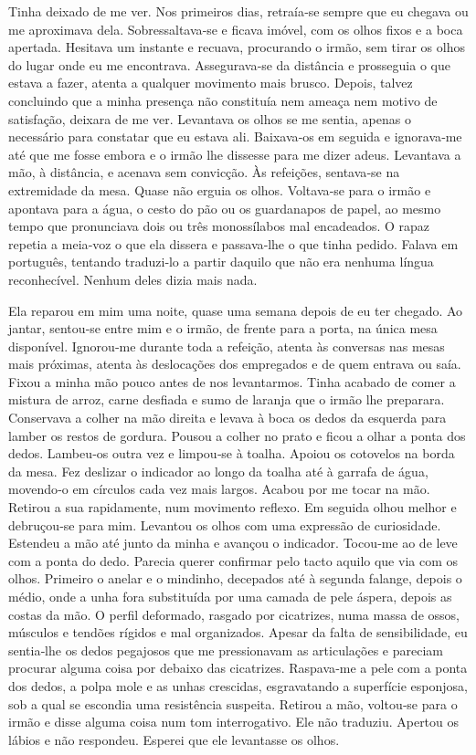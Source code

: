 Tinha deixado de me ver. Nos primeiros dias, retraía­‑se sempre que eu
chegava ou me aproximava dela. Sobressaltava­‑se e ficava imóvel, com os
olhos fixos e a boca apertada. Hesitava um instante e recuava,
procurando o irmão, sem tirar os olhos do lugar onde eu me encontrava.
Assegurava­‑se da distância e prosseguia o que estava a fazer, atenta a
qualquer movimento mais brusco. Depois, talvez concluindo que a minha
presença não constituía nem ameaça nem motivo de satisfação, deixara de
me ver. Levantava os olhos se me sentia, apenas o necessário para
constatar que eu estava ali. Baixava­‑os em seguida e ignorava­‑me até
que me fosse embora e o irmão lhe dissesse para me dizer adeus.
Levantava a mão, à distância, e acenava sem convicção. Às refeições,
sentava­‑se na extremidade da mesa. Quase não erguia os olhos.
Voltava­‑se para o irmão e apontava para a água, o cesto do pão ou os
guardanapos de papel, ao mesmo tempo que pronunciava dois ou três
monossílabos mal encadeados. O rapaz repetia a meia­‑voz o que ela
dissera e passava­‑lhe o que tinha pedido. Falava em português, tentando
traduzi­‑lo a partir daquilo que não era nenhuma língua reconhecível.
Nenhum deles dizia mais nada.

Ela reparou em mim uma noite, quase uma semana depois de eu ter chegado.
Ao jantar, sentou­‑se entre mim e o irmão, de frente para a porta, na
única mesa disponível. Ignorou­‑me durante toda a refeição, atenta às
conversas nas mesas mais próximas, atenta às deslocações dos empregados
e de quem entrava ou saía. Fixou a minha mão pouco antes de nos
levantarmos. Tinha acabado de comer a mistura de arroz, carne desfiada e
sumo de laranja que o irmão lhe preparara. Conservava a colher na mão
direita e levava à boca os dedos da esquerda para lamber os restos de
gordura. Pousou a colher no prato e ficou a olhar a ponta dos dedos.
Lambeu­‑os outra vez e limpou­‑se à toalha. Apoiou os cotovelos na borda
da mesa. Fez deslizar o indicador ao longo da toalha até à garrafa de
água, movendo­‑o em círculos cada vez mais largos. Acabou por me tocar
na mão. Retirou a sua rapidamente, num movimento reflexo. Em seguida
olhou melhor e debruçou­‑se para mim. Levantou os olhos com uma
expressão de curiosidade. Estendeu a mão até junto da minha e avançou o
indicador. Tocou­‑me ao de leve com a ponta do dedo. Parecia querer
confirmar pelo tacto aquilo que via com os olhos. Primeiro o anelar e o
mindinho, decepados até à segunda falange, depois o médio, onde a unha
fora substituída por uma camada de pele áspera, depois as costas da mão.
O perfil deformado, rasgado por cicatrizes, numa massa de ossos,
músculos e tendões rígidos e mal organizados. Apesar da falta de
sensibilidade, eu sentia­‑lhe os dedos pegajosos que me pressionavam as
articulações e pareciam procurar alguma coisa por debaixo das
cicatrizes. Raspava­‑me a pele com a ponta dos dedos, a polpa mole e as
unhas crescidas, esgravatando a superfície esponjosa, sob a qual se
escondia uma resistência suspeita. Retirou a mão, voltou­‑se para o
irmão e disse alguma coisa num tom interrogativo. Ele não traduziu.
Apertou os lábios e não respondeu. Esperei que ele levantasse os olhos.

